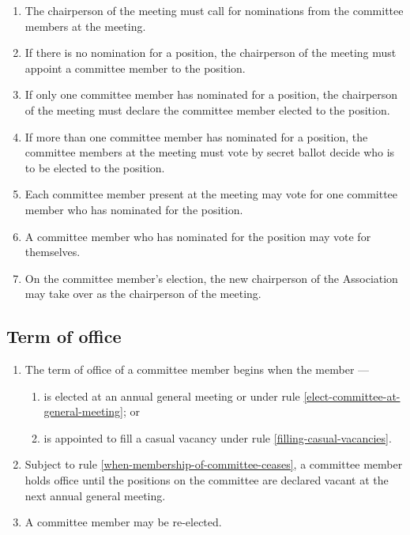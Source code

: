 \documentclass[../constitution.tex]{subfiles}
\begin{document}
\begin{enumerate}
        \begin{enumerate}
          \item The chairperson of the meeting must call for nominations from the committee members at the meeting.
          \item If there is no nomination for a position, the chairperson of the meeting must appoint a committee member to the position.
          \item If only one committee member has nominated for a position, the chairperson of the meeting must declare the committee member elected to the position.
          \item If more than one committee member has nominated for a position, the committee members at the meeting must vote by secret ballot decide who is to be elected to the position.
          \item Each committee member present at the meeting may vote for one committee member who has nominated for the position.
          \item A committee member who has nominated for the position may vote for themselves.
          \item On the committee member's election, the new chairperson of the Association may take over as the chairperson of the meeting.
        \end{enumerate}

\end{enumerate}

\hypertarget{term-of-office}{%
  \subsection{Term of office}\label{term-of-office}}

\begin{enumerate}

  \item The term of office of a committee member begins when the member ---

        \begin{enumerate}

          \item is elected at an annual general meeting or under rule \ref{elect-committee-at-general-meeting}; or
          \item is appointed to fill a casual vacancy under rule \ref{filling-casual-vacancies}.
        \end{enumerate}
  \item Subject to rule \ref{when-membership-of-committee-ceases}, a committee member holds office until the positions on the committee are declared vacant at the next annual general meeting.
  \item A committee member may be re-elected.
\end{enumerate}
\end{document}
